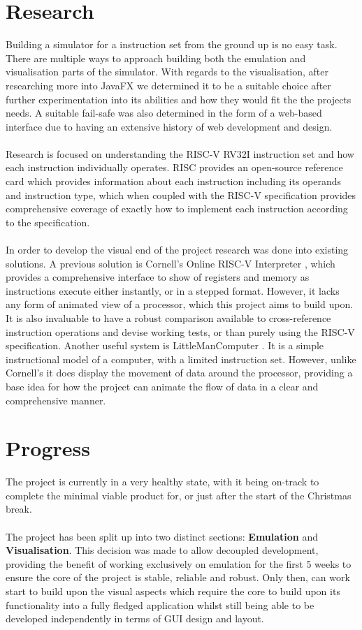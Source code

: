 \documentclass[a4paper,fleqn,twoside,12pt]{article}
\begin{document}
\section{Research}
Building a simulator for a instruction set from the ground up is no easy task. There are multiple ways to approach building both the emulation and visualisation parts of the simulator. With regards to the visualisation, after researching more into JavaFX \cite{sunmicrosystems_2022_javafx} we determined it to be a suitable choice after further experimentation into its abilities and how they would fit the the projects needs. A suitable fail-safe was also determined in the form of a web-based interface due to having an extensive history of web development and design.
\\\\
Research is focused on understanding the RISC-V RV32I \cite{risc_spec} instruction set and how each instruction individually operates. RISC provides an open-source reference card \cite{riscv_greencard} which provides information about each instruction including its operands and instruction type, which when coupled with the RISC-V specification \cite{risc_spec} provides comprehensive coverage of exactly how to implement each instruction according to the specification.
\\\\
In order to develop the visual end of the project research was done into existing solutions. A previous solution is Cornell's Online RISC-V Interpreter \cite{cornelluniversity_riscv}, which provides a comprehensive interface to show of registers  and memory as instructions execute either instantly, or in a stepped format. However, it lacks any form of animated view of a processor, which this project aims to build upon. It is also invaluable to have a robust comparison available to cross-reference instruction operations and devise working tests, or than purely using the RISC-V specification. Another useful system is LittleManComputer \cite{higginson_2014_little}. It is a simple instructional model of a computer, with a limited instruction set. However, unlike Cornell's it does display the movement of data around the processor, providing a base idea for how the project can animate the flow of data in a clear and comprehensive manner.


\section{Progress}
The project is currently in a very healthy state, with it being on-track to complete the minimal viable product for, or just after the start of the Christmas break.
\\\\
The project has been split up into two distinct sections: \textbf{Emulation} and \textbf{Visualisation}. This decision was made to allow decoupled development, providing the benefit of working exclusively on emulation for the first 5 weeks to ensure the core of the project is stable, reliable and robust. Only then, can work start to build upon the visual aspects which require the core to build upon its functionality into a fully fledged application whilst still being able to be developed independently in terms of GUI design and layout.
\end{document}
